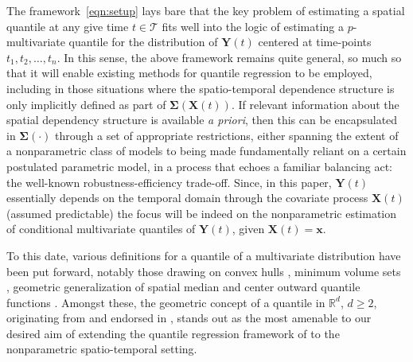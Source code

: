 \documentclass[aos]{imsart}
\theoremstyle{plain}
\theoremstyle{remark}
\newcommand{\bb}[1]{\boldsymbol{#1}}
\begin{document}
The framework~\eqref{eqn:setup} lays bare that the key problem of estimating a spatial quantile at any give time $t \in \mathcal{T}$ fits well into the logic of estimating a $p$-multivariate quantile for the distribution of $\bb{Y}(t)$ centered at time-points $t_1, t_2, \hdots, t_n$. In this sense, the above framework remains quite general, so much so that it will enable existing methods for quantile regression to be employed, including in those situations where the spatio-temporal dependence structure is only implicitly defined as part of $\bb{\Sigma}(\bb{X}(t))$. If relevant information about the spatial dependency structure is available \emph{a priori}, then this can be encapsulated in $\bb{\Sigma}(\cdot)$ through a set of appropriate restrictions, either spanning the extent of a nonparametric class of models to being made fundamentally reliant on a certain postulated parametric model, in a process that echoes a familiar balancing act: the well-known robustness-efficiency trade-off. Since, in this paper, $\bb{Y}(t)$ essentially depends on the temporal domain through the covariate process $\bb{X}(t)$ (assumed predictable) the focus will be indeed on the nonparametric estimation of conditional multivariate quantiles of $\bb{Y}(t)$, given $\bb{X}(t) = \bb{x}$.

To this date, various definitions for a quantile of a multivariate distribution have been put forward, notably those drawing on convex hulls \citep{eddy1985ordering}, minimum volume sets \citep{einmahl1992generalized}, geometric generalization of spatial median \citep{chaudhuri1996geometric} and center outward quantile functions \citep{figalli2018continuity}. Amongst these, the geometric concept of a quantile in $\mathbb{R}^d$, $d \geqslant 2$, originating from \cite{chaudhuri1996geometric} and endorsed in \cite{KonenPaindaveine22}, stands out as the most amenable to our desired aim of extending the quantile regression framework of \cite{koenker1978regression} to the nonparametric spatio-temporal setting.
\end{document}
